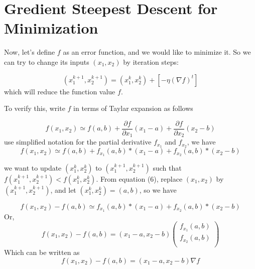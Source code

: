 \documentclass[conference]{IEEEtran}
\begin{document}
\section{Gredient Steepest Descent for Minimization}

Now, let's define $f$ as an error function, and
we would like to minimize it. So we can try to 
change its inputs $(x_1,x_2)$ by iteration steps: 

\begin{equation}
(x_1^{k+1}, x_2^{k+1}) =
(x_1^k, x_2^k) + [- \eta (\nabla f)^t ]   
\end{equation}
which will reduce the function value $f$. 
 
To verify this, write $f$ in terms of Taylar 
expansion as follows 

\begin{equation}
f(x_1,x_2) \simeq f(a,b) + 
\frac{ \partial f} { \partial x_1 } (x_1 - a) 
+
\frac{ \partial f} { \partial x_2 } (x_2 - b)  
\end{equation}
use simplified notation for the partial derivative
$f_{x_1}$ and $f_{x_2}$, we have 
\begin{equation}
f(x_1,x_2) \simeq f(a,b) + 
f_{x_1}(a,b) * (x_1 - a) 
+
f_{x_2}(a,b) * (x_2 - b)  
\end{equation}

we want to update $(x_1^k, x_2^k)$ to 
$(x_1^{k+1}, x_2^{k+1})$ such that
$f(x_1^{k+1}, x_2^{k+1}) < f(x_1^k, x_2^k)$. 
From equation (6), replace  
$(x_1, x_2)$ by $(x_1^{k+1}, x_2^{k+1})$, and 
let $(x_1^k, x_2^k) = (a,b)$, so we have  
 
\begin{equation}
f(x_1,x_2) - f(a,b) \simeq  
f_{x_1}(a,b) * (x_1 - a) 
+
f_{x_2}(a,b) * (x_2 - b) 
\end{equation}
Or, 
\begin{equation}
f(x_1,x_2) - f(a,b)
= (x_1 - a, x_2 - b) 
\left(\begin{array}{c} 
f_{x_1}(a,b) \\ 
f_{x_2}(a,b) \\ 
\end{array}\right)
\end{equation}
Which can be written as 
\begin{equation}
f(x_1,x_2) - f(a,b)
=(x_1 - a, x_2 - b) \nabla f 
\end{equation}
\end{document}
